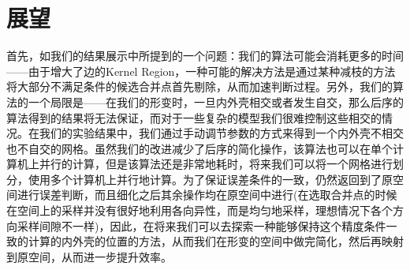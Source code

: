 \section{展望}
首先，如我们的结果展示中所提到的一个问题：我们的算法可能会消耗更多的时间——由于增大了边的Kernel Region，一种可能的解决方法是通过某种减枝的方法将大部分不满足条件的候选合并点首先剔除，从而加速判断过程。另外，我们的算法的一个局限是——在我们的形变时，一旦内外壳相交或者发生自交，那么后序的算法得到的结果将无法保证，而对于一些复杂的模型我们很难控制这些相交的情况。在我们的实验结果中，我们通过手动调节参数的方式来得到一个内外壳不相交也不自交的网格。虽然我们的改进减少了后序的简化操作，该算法也可以在单个计算机上并行的计算，但是该算法还是非常地耗时，将来我们可以将一个网格进行划分，使用多个计算机上并行地计算。为了保证误差条件的一致，仍然返回到了原空间进行误差判断，而且细化之后其余操作均在原空间中进行(在选取合并点的时候在空间上的采样并没有很好地利用各向异性，而是均匀地采样，理想情况下各个方向采样间隙不一样)，因此，在将来我们可以去探索一种能够保持这个精度条件一致的计算的内外壳的位置的方法，从而我们在形变的空间中做完简化，然后再映射到原空间，从而进一步提升效率。
